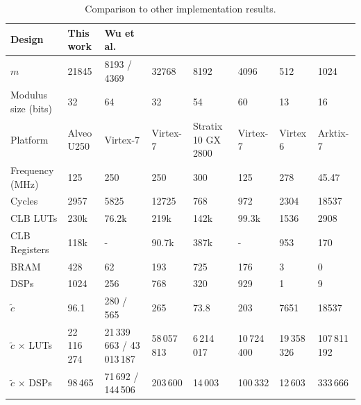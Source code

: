 \documentclass[lettersize,journal]{IEEEtran}
\begin{document}
\begin{table}[!t]
\caption{Comparison to other implementation results.}
\label{table:implementation_comparison}
\centering
\begin{tabular}{ |l*{7}{|m{0.09\textwidth}}| } 
 \hline
 Design               & This work   & Wu et al.\cite{9937536} & \cite{ozturk2574340} & \cite{10.1145/3373376.3378523} & \cite{9171507} & \cite{cryptoeprint:2013/866} & \cite{cryptoeprint:2020/446} \\ \hline \hline
 $m$                  & 21845       & 8193 / 4369  & 32768    & 8192                & 4096     & 512      & 1024      \\  \hline
 Modulus size (bits)  & 32          & 64           & 32       & 54                  & 60       & 13       & 16        \\  \hline
 Platform             & Alveo U250  & Virtex-7     & Virtex-7 & Stratix 10 GX 2800  & Virtex-7 & Virtex 6 & Arktix-7  \\  \hline
 Frequency (MHz)      & 125         & 250          & 250      & 300                 & 125      & 278      & 45.47     \\  \hline
 Cycles               & 2957        & 5825         & 12725    & 768                 & 972      & 2304     & 18537     \\  \hline
 CLB LUTs             & 230k        & 76.2k        & 219k     & 142k                & 99.3k    & 1536     & 2908      \\  \hline
 CLB Registers        & 118k        & -            & 90.7k    & 387k                & -        & 953      & 170       \\  \hline
 BRAM                 & 428         & 62           & 193      & 725                 & 176      & 3        & 0         \\  \hline
 DSPs                 & 1024        & 256          & 768      & 320                 & 929      & 1        & 9         \\  \hline
 $\tilde{c}$          & 96.1        & 280 / 565    & 265      & 73.8                & 203      & 7651     & 18537     \\  \hline
 $\tilde{c}$ $\times$ LUTs& 22\,116\,274 & 21\,339\,663 / 43\,013\,187 & 58\,057\,813 & 6\,214\,017 & 10\,724\,400 & 19\,358\,326 & 107\,811\,192 \\ \hline
 $\tilde{c}$ $\times$ DSPs& 98\,465      & 71\,692 / 144\,506 & 203\,600 & 14\,003 & 100\,332 & 12\,603 & 333\,666 \\
 \hline
\end{tabular}
\end{table}
\end{document}
